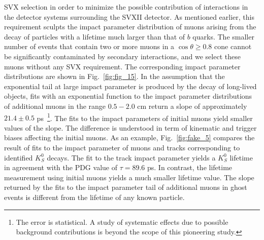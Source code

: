 \documentclass[aps,prd,preprint,floatfix,nofootinbib,superscriptaddress,showpacs,amssymb]{revtex4}
\begin{document}
 SVX selection in order to minimize the possible contribution of interactions
 in the detector systems surrounding the SVXII detector. As mentioned earlier,
 this requirement sculpts the impact parameter distribution of muons arising
 from the decay of particles with a lifetime much larger than that of $b$
 quarks. The smaller number of events that contain two or more muons in a
 $\cos \theta \geq 0.8$ cone cannot be significantly contaminated by secondary
 interactions, and we select these muons without any SVX requirement.
 The corresponding impact parameter distributions are shown in
 Fig.~\ref{fig:fig_15}. In the assumption that the exponential tail
 at large impact parameter is produced by the decay of long-lived
 objects,  fits with an exponential function to the impact
 parameter distributions of additional muons in the range $0.5-2.0$ cm
 return a slope of approximately $21.4 \pm 0.5$ ps~\footnote{
 The error is statistical. A study of systematic effects due to possible
 background contributions is beyond the scope of this pioneering study.}.
 The fits to the impact parameters of initial muons yield smaller values
 of the slope. The difference is understood in term of kinematic and 
 trigger biases affecting the initial muons. As an example,
 Fig.~\ref{fig:fake_5} compares the result of fits to the impact parameter
 of muons and tracks corresponding to identified $K^0_S$ decays. 
 The fit to the track impact parameter yields a $K^0_S$ lifetime in
 agreement with the  PDG value of $\tau=89.6$ ps. In contrast, the
 lifetime measurement using initial muons yields a much smaller lifetime 
 value. The slope
 returned by the fits to the impact parameter tail of additional muons in
 ghost events is different from the lifetime of any known particle. 
\end{document}
